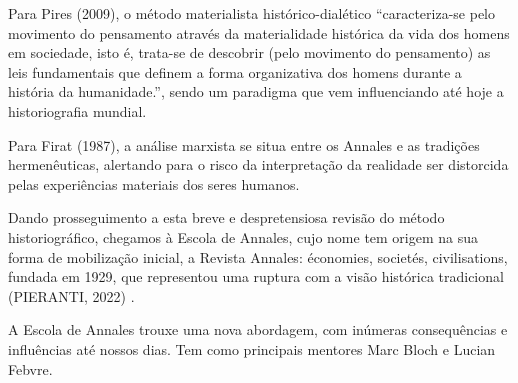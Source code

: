 \documentclass[
12pt,		%
openright,	%
twoside,  %
a4paper,			%
chapter=TITLE,		%
english,			%
french,				%
spanish,			%
brazil				%
]{USPSC-classe/USPSC}
\begin{document}
Para  Pires (2009), o m\'etodo materialista hist\'orico-dial\'etico “caracteriza-se pelo movimento do pensamento atrav\'es da materialidade hist\'orica da vida dos homens em sociedade, isto \'e, trata-se de descobrir (pelo movimento do pensamento) as leis fundamentais que definem a forma organizativa dos homens durante a hist\'oria da humanidade.”, sendo um paradigma que vem influenciando at\'e hoje a historiografia mundial.

















Para Firat (1987), \textquotedbl a an\'alise marxista se situa entre os Annales e as tradi\c{c}\~oes hermen\^euticas\textquotedbl , alertando para o risco da interpreta\c{c}\~ao da realidade ser distorcida pelas \textquotedbl experi\^encias materiais dos seres humanos\textquotedbl .

















Dando prosseguimento a esta breve e despretensiosa revis\~ao do m\'etodo historiogr\'afico, chegamos \`a Escola de Annales, cujo nome tem origem na sua forma de mobiliza\c{c}\~ao inicial, a Revista Annales: \'economies, societ\'es, civilisations, fundada em 1929, que representou uma ruptura com a vis\~ao hist\'orica tradicional (PIERANTI, 2022) .

















A Escola de Annales trouxe uma nova abordagem, com in\'umeras consequ\^encias e influ\^encias at\'e nossos dias. Tem como principais mentores  Marc Bloch e Lucian Febvre.
\end{document}

